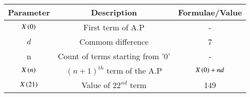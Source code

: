 \renewcommand{\arraystretch}{2}
\begin{tabular}{|c|c|c|}
\hline 
\setlength{\tabcolsep}{1pt}
\textbf{Parameter}  &\textbf{Description} &\textbf{Formulae/Value} \\
\hline
$X\left(0\right)$ & First term of A.P & - \\
\hline
\textbf{$d$} & Commom difference & 7 \\
\hline
n & Count of terms starting from '0' & - \\
\hline
$X\left(n\right)$ & $(n+1)^{th}$ term of the A.P & $X\left(0\right) + nd$ \\
\hline
$X\left(21\right)$ & Value of $22^{nd}$ term & 149 \\

\hline

\end{tabular}
